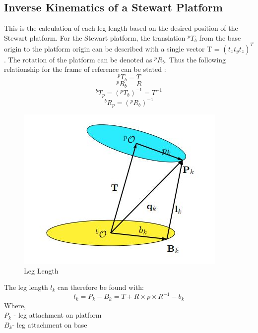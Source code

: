 \subsection{Inverse Kinematics of a Stewart Platform}
This is the calculation of each leg length based on the desired position of the Stewart platform. 
For the Stewart platform, the translation $^{p}T_{b}$ from the base origin to the platform origin can be described with a single vector T = $(t_{x} t_{y} t_{z})^{T} $. The rotation of the platform can be denoted as $^{p}R_{b}$. Thus the following relationship for the frame of reference can be stated \cite{Eisele_2019}:
$$^{p}T_{b} = T$$
	$$^{p}R_{b} = R$$
	$$^{b}T_{p} =(^{p}T_{b})^{-1} =T^{-1}$$
	$$^{b}R_{p} = (^{p}R_{b})^{-1} $$
\begin{center}
	\begin{figure}[!h]
	\centering
	\includegraphics[width=0.4\linewidth]{Figures/servo2}
	\caption[Leg length]{Leg Length \cite{Eisele_2019}}
	\end{figure}
\end{center}
The leg length $l_{k}$ can therefore be found with:
\begin{equation}
l_{k} = P_{k} - B_{k} = T + R \times p \times R^{-1} - b_{k}
\end{equation}
Where,\\
$P_{k}$ - leg attachment on platform \\
$B_{k}$- leg attachment on base 
